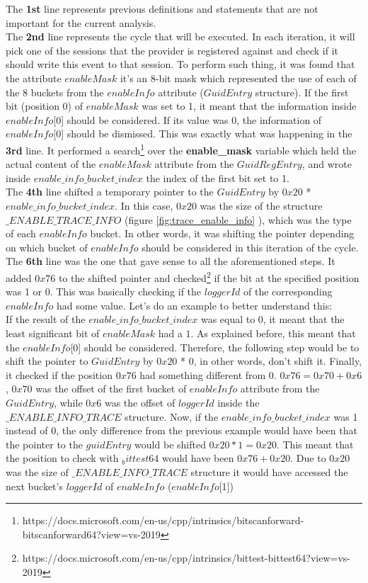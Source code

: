 The {\bfseries 1st} line represents previous definitions and statements that are not important for the current analysis. \\
The {\bfseries 2nd} line represents the cycle that will be executed. In each iteration, it will pick one of the sessions that the provider is registered against and check if it should write this event to that session.
To perform such thing, it was found that the attribute $enableMask$ it's an 8-bit mask which represented the use of each of the 8 buckets from the $enableInfo$ attribute ($GuidEntry$ structure). If the first bit (position 0) of $enableMask$ was set to 1, it meant that the information inside $enableInfo$[0] should be considered. If its value was 0, the information of $enableInfo$[0] should be dismissed. 
This was exactly what was happening in the {\bfseries 3rd} line. It performed a search\footnote{https://docs.microsoft.com/en-us/cpp/intrinsics/bitscanforward-bitscanforward64?view=vs-2019} over the {\bfseries enable\_mask} variable which held the actual content of the $enableMask$ attribute from the $GuidRegEntry$, and wrote inside $enable\_info\_bucket\_index$ the index of the first bit set to 1. \\
The {\bfseries 4th} line shifted a temporary pointer to the $GuidEntry$ by $0x20$ * $enable\_info\_bucket\_index$. In this case, $0x20$ was the size of the structure $\_ENABLE\_TRACE\_INFO$ (figure \ref{fig:trace_enable_info} ), which was the type of each $enableInfo$ bucket. In other words, it was shifting the pointer depending on which bucket of $enableInfo$ should be considered in this iteration of the cycle.\\
The {\bfseries 6th} line was the one that gave sense to all the aforementioned steps. It added $0x76$ to the shifted pointer and checked\footnote{https://docs.microsoft.com/en-us/cpp/intrinsics/bittest-bittest64?view=vs-2019} if the bit at the specified position was 1 or 0. This was basically checking if the $loggerId$ of the corresponding $enableInfo$ had some value. Let's do an example to better understand this: \\
If the result of the $enable\_info\_bucket\_index$ was equal to 0, it meant that the least significant bit of $enableMask$ had a $1$. As explained before, this meant that the $enableInfo$[0] should be considered. Therefore, the following step would be to shift the pointer to $GuidEntry$ by $0x20$ * 0, in other words, don't shift it. Finally, it checked if the position $0x76$ had something different from 0. $0x76 = 0x70 + 0x6$,  $0x70$ was the offset of the first bucket of $enableInfo$ attribute from the $GuidEntry$, while $0x6$ was the offset of $loggerId$ inside the $\_ENABLE\_INFO\_TRACE$ structure. Now, if the $enable\_info\_bucket\_index$ was 1 instead of 0, the only difference from the previous example would have been that the pointer to the $guidEntry$ would be shifted $0x20 * 1 = 0x20$. This meant that the position to check with $_bittest64$ would have been $0x76 + 0x20$. Due to $0x20$ was the size of $\_ENABLE\_INFO\_TRACE$ structure it would have accessed the next bucket's $loggerId$ of $enableInfo$ ($enableInfo$[1])\\
